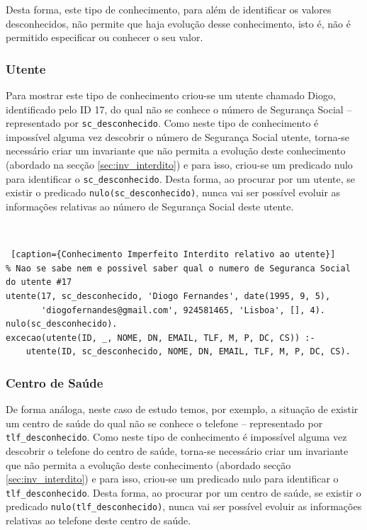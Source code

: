 \documentclass[a4paper, 11pt]{article}
\begin{document}
Desta forma, este tipo de conhecimento, para além de
identificar os valores desconhecidos, não permite que haja evolução desse conhecimento, isto é, 
não
é permitido especificar ou conhecer o seu valor.

\subsubsection*{Utente}

Para mostrar este tipo de conhecimento criou-se um utente chamado Diogo, identificado pelo ID 17, 
do qual
não se conhece o número de Segurança Social -- representado por \texttt{sc\_desconhecido}. Como 
neste tipo de conhecimento
é impossível alguma vez descobrir o número de Segurança Social utente, torna-se necessário 
criar um invariante que não permita
a evolução deste conhecimento (abordado na secção \ref{sec:inv_interdito}) e para isso, 
criou-se um predicado nulo para identificar o \texttt{sc\_desconhecido}.
Desta forma, ao procurar por um utente, se existir o predicado \texttt{nulo(sc\_desconhecido)}, 
nunca vai ser
possível evoluir as informações relativas ao número de Segurança Social deste utente.

\

\begin{lstlisting} [caption={Conhecimento Imperfeito Interdito relativo ao utente}]
% Nao se sabe nem e possivel saber qual o numero de Seguranca Social do utente #17
utente(17, sc_desconhecido, 'Diogo Fernandes', date(1995, 9, 5),
       'diogofernandes@gmail.com', 924581465, 'Lisboa', [], 4).
nulo(sc_desconhecido).
excecao(utente(ID, _, NOME, DN, EMAIL, TLF, M, P, DC, CS)) :-
    utente(ID, sc_desconhecido, NOME, DN, EMAIL, TLF, M, P, DC, CS).
\end{lstlisting}

\subsubsection*{Centro de Saúde}

De forma análoga, neste caso de estudo temos, por exemplo, a situação de existir um centro de 
saúde do qual não se conhece o telefone -- representado por \texttt{tlf\_desconhecido}. Como 
neste tipo de conhecimento
é impossível alguma vez descobrir o telefone do centro de saúde, torna-se necessário criar um 
invariante que não permita a evolução deste conhecimento (abordado secção 
\ref{sec:inv_interdito}) e para isso, criou-se um predicado nulo para identificar o 
\texttt{tlf\_desconhecido}.
Desta forma, ao procurar por um centro de saúde, se existir o predicado 
\texttt{nulo(tlf\_desconhecido)}, nunca vai ser
possível evoluir as informações relativas ao telefone deste centro de saúde.
\end{document}
